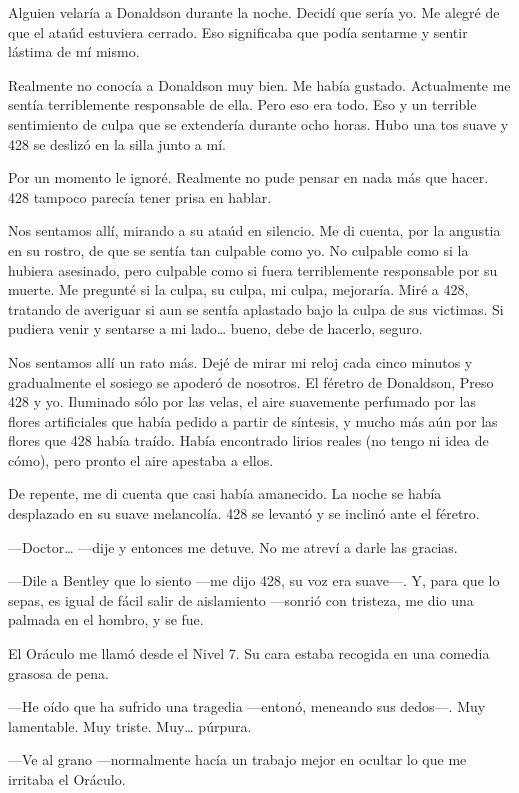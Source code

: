 Alguien velaría a Donaldson durante la noche. Decidí que sería yo. Me
alegré de que el ataúd estuviera cerrado. Eso significaba que podía
sentarme y sentir lástima de mí mismo.

Realmente no conocía a Donaldson muy bien. Me había gustado. Actualmente
me sentía terriblemente responsable de ella. Pero eso era todo. Eso y un
terrible sentimiento de culpa que se extendería durante ocho horas. Hubo
una tos suave y 428 se deslizó en la silla junto a mí.

Por un momento le ignoré. Realmente no pude pensar en nada más que
hacer. 428 tampoco parecía tener prisa en hablar.

Nos sentamos allí, mirando a su ataúd en silencio. Me di cuenta, por la
angustia en su rostro, de que se sentía tan culpable como yo. No
culpable como si la hubiera asesinado, pero culpable como si fuera
terriblemente responsable por su muerte. Me pregunté si la culpa, su
culpa, mi culpa, mejoraría. Miré a 428, tratando de averiguar si aun se
sentía aplastado bajo la culpa de sus victimas. Si pudiera venir y
sentarse a mi lado\ldots{} bueno, debe de hacerlo, seguro.

Nos sentamos allí un rato más. Dejé de mirar mi reloj cada cinco minutos
y gradualmente el sosiego se apoderó de nosotros. El féretro de
Donaldson, Preso 428 y yo. Iluminado sólo por las velas, el aire
suavemente perfumado por las flores artificiales que había pedido a
partir de síntesis, y mucho más aún por las flores que 428 había traído.
Había encontrado lirios reales (no tengo ni idea de cómo), pero pronto
el aire apestaba a ellos.

De repente, me di cuenta que casi había amanecido. La noche se había
desplazado en su suave melancolía. 428 se levantó y se inclinó ante el
féretro.

---Doctor\ldots{} ---dije y entonces me detuve. No me atreví a darle las
gracias.

---Dile a Bentley que lo siento ---me dijo 428, su voz era suave---. Y,
para que lo sepas, es igual de fácil salir de aislamiento ---sonrió con
tristeza, me dio una palmada en el hombro, y se fue.

El Oráculo me llamó desde el Nivel 7. Su cara estaba recogida en una
comedia grasosa de pena.

---He oído que ha sufrido una tragedia ---entonó, meneando sus dedos---.
Muy lamentable. Muy triste. Muy\ldots{} púrpura.

---Ve al grano ---normalmente hacía un trabajo mejor en ocultar lo que
me irritaba el Oráculo.

